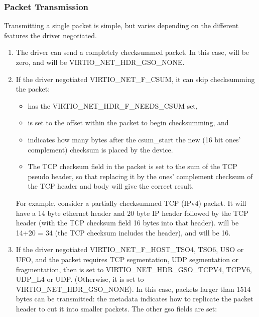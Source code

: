 \subsubsection{Packet Transmission}\label{sec:Device Types / Network Device / Device Operation / Packet Transmission}

Transmitting a single packet is simple, but varies depending on
the different features the driver negotiated.

\begin{enumerate}
\item The driver can send a completely checksummed packet.  In this case,
   will be zero, and  will be VIRTIO_NET_HDR_GSO_NONE.

\item If the driver negotiated VIRTIO_NET_F_CSUM, it can skip
  checksumming the packet:
  \begin{itemize}
  \item {} has the VIRTIO_NET_HDR_F_NEEDS_CSUM set,

  \item {} is set to the offset within the packet to begin checksumming,
    and

  \item {} indicates how many bytes after the csum_start the
    new (16 bit ones' complement) checksum is placed by the device.

  \item The TCP checksum field in the packet is set to the sum
    of the TCP pseudo header, so that replacing it by the ones'
    complement checksum of the TCP header and body will give the
    correct result.
  \end{itemize}

\begin{note}
For example, consider a partially checksummed TCP (IPv4) packet.
It will have a 14 byte ethernet header and 20 byte IP header
followed by the TCP header (with the TCP checksum field 16 bytes
into that header).  will be 14+20 = 34 (the TCP
checksum includes the header), and  will be 16.
\end{note}

\item If the driver negotiated
  VIRTIO_NET_F_HOST_TSO4, TSO6, USO or UFO, and the packet requires
  TCP segmentation, UDP segmentation or fragmentation, then 
  is set to VIRTIO_NET_HDR_GSO_TCPV4, TCPV6, UDP_L4 or UDP.
  (Otherwise, it is set to VIRTIO_NET_HDR_GSO_NONE). In this
  case, packets larger than 1514 bytes can be transmitted: the
  metadata indicates how to replicate the packet header to cut it
  into smaller packets. The other gso fields are set:


\end{enumerate}
